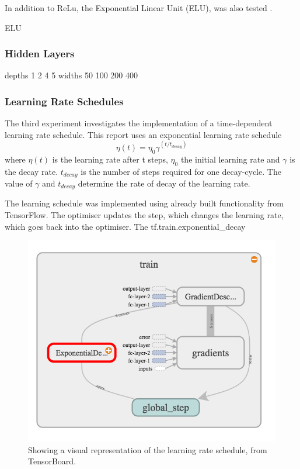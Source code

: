 \documentclass[]{article}
\begin{document}
In addition to ReLu, the Exponential Linear Unit (ELU), was also tested \cite{elu}. 

ELU

\subsubsection{Hidden Layers}

depths 1 2 4 5
widths 50 100 200 400


\subsubsection{Learning Rate Schedules}

The third experiment investigates the implementation of a time-dependent learning rate schedule. This report uses an exponential learning rate schedule  
\begin{equation} \label{eq:1}
\eta(t) = \eta_{0} \gamma ^{(t / t_{decay})}
\end{equation}
where \(\eta(t)\) is the learning rate after t steps, \(\eta_{0}\) the initial learning rate and \(\gamma\) is the decay rate. \(t_{decay}\) is the number of steps required for one decay-cycle. The value of \(\gamma\) and \(t_{decay}\) determine the rate of decay of the learning rate. 

The learning schedule was implemented using already built functionality from TensorFlow. The optimiser updates the step, which changes the learning rate, which goes back into the optimiser.  The tf.train.exponential\_decay

\begin{figure}[h]
	\includegraphics[width=\textwidth]{model_2}
	\caption{Showing a visual representation of the learning rate schedule, from TensorBoard.}
	\label{model_2}
	\centering
\end{figure}
\end{document}
